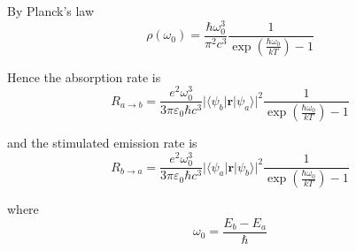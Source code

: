 By Planck's law
\begin{equation*}
\rho(\omega_0)=\frac{\hbar\omega_0^3}{\pi^2c^3}
\frac{1}{\exp\left(\frac{\hbar\omega_0}{kT}\right)-1}
\end{equation*}

Hence the absorption rate is
\begin{equation*}
R_{a\rightarrow b}
=\frac{e^2\omega_0^3}{3\pi\varepsilon_0\hbar c^3}
\bigl|\langle\psi_b|\mathbf r|\psi_a\rangle\bigr|^2
\frac{1}{\exp\left(\frac{\hbar\omega_0}{kT}\right)-1}
\tag{2}
\end{equation*}

and the stimulated emission rate is
\begin{equation*}
R_{b\rightarrow a}
=\frac{e^2\omega_0^3}{3\pi\varepsilon_0\hbar c^3}
\bigl|\langle\psi_a|\mathbf r|\psi_b\rangle\bigr|^2
\frac{1}{\exp\left(\frac{\hbar\omega_0}{kT}\right)-1}
\tag{3}
\end{equation*}

where
\begin{equation*}
\omega_0=\frac{E_b-E_a}{\hbar}
\end{equation*}


